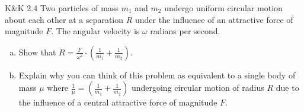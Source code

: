 \documentclass{esg8012pset}
\begin{document}
\begin{problem}{K\&K 2.4}
  Two particles of mass $m_1$ and $m_2$ undergo uniform circular motion about each other at a separation $R$ under the influence of an attractive force of magnitude $F$.  The angular velocity is $\omega$ radians per second.
  \begin{enumerate}[a)]
    \item Show that $R = \frac{F}{\omega^2} \cdot \left(\frac{1}{m_1} + \frac{1}{m_2}\right)$.
    \item Explain why you can think of this problem as equivalent to a single body of mass $\mu$ where $\frac{1}{\mu} = \left(\frac{1}{m_1} + \frac{1}{m_2}\right)$ undergoing circular motion of radius $R$ due to the influence of a central attractive force of magnitude $F$.
  \end{enumerate}
\end{problem}
\end{document}
